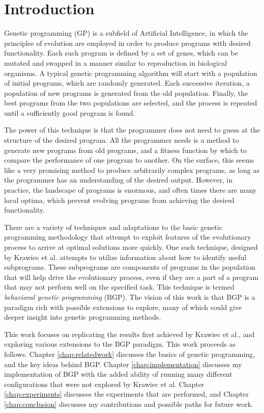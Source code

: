 \chapter{Introduction}
\label{chap:intro}
Genetic programming (GP) is a subfield of Artificial Intelligence, in which the principles of evolution are employed in order to produce programs with desired functionality.  Each such program is defined by a set of genes, which can be mutated and swapped in a manner similar to reproduction in biological organisms.  A typical genetic programming algorithm will start with a population of initial programs, which are randomly generated.  Each successive iteration, a population of new programs is generated from the old population.  Finally, the best programs from the two populations are selected, and the process is repeated until a sufficiently good program is found.

The power of this technique is that the programmer does not need to guess at the structure of the desired program.  All the programmer needs is a method to generate new programs from old programs, and a fitness function by which to compare the performance of one program to another.  On the surface, this seems like a very promising method to produce arbitrarily complex programs, as long as the programmer has an understanding of the desired output.  However, in practice, the landscape of programs is enormous, and often times there are many local optima, which prevent evolving programs from achieving the desired functionality.

There are a variety of techniques and adaptations to the basic genetic programming methodology that attempt to exploit features of the evolutionary process to arrive at optimal solutions more quickly.  One such technique, designed by Krawiec et al. \cite{krawiec} attempts to utilize information about how to identify useful subprograms.  These subprograms are components of programs in the population that will help drive the evolutionary process, even if they are a part of a program that may not perform well on the specified task.  This technique is termed \textit{behavioral genetic programming} (BGP).  The vision of this work is that BGP is a paradigm rich with possible extensions to explore, many of which could give deeper insight into genetic programming methods.

This work focuses on replicating the results first achieved by Krawiec et al., and exploring various extensions to the BGP paradigm.  This work proceeds as follows. Chapter \ref{chap:relatedwork} discusses the basics of genetic programming, and the key ideas behind BGP.  Chapter \ref{chap:implementation} discusses my implementation of BGP with the added ability of running many different configurations that were not explored by Krawiec et al.  Chapter \ref{chap:experiments} discusses the experiments that are performed, and Chapter \ref{chap:conclusion} discusses my contributions and possible paths for future work.
